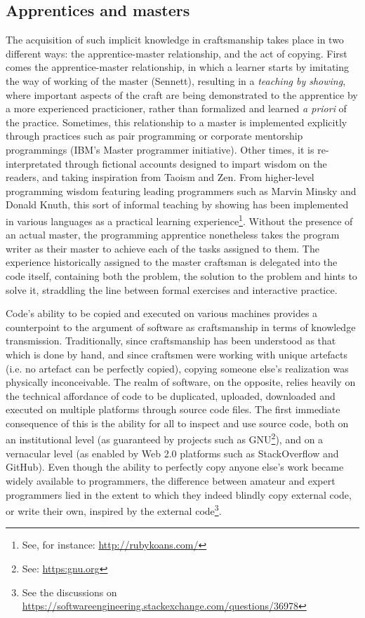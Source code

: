 \documentclass{article}
\begin{document}
\subsection{Apprentices and masters}

The acquisition of such implicit knowledge in craftsmanship takes place in two different ways: the apprentice-master relationship, and the act of copying. First comes the apprentice-master relationship, in which a learner starts by  imitating the way of working of the master (Sennett), resulting in a \emph{teaching by showing}, where important aspects of the craft are being demonstrated to the apprentice by a more experienced practicioner, rather than formalized and learned \emph{a priori} of the practice. Sometimes, this relationship to a master is implemented explicitly through practices such as pair programming\cite{williams_pair_2003} or corporate mentorship programmings (IBM's Master programmer initiative). Other times, it is re-interpretated through fictional accounts designed to impart wisdom on the readers, and taking inspiration from Taoism and Zen\cite{james_tao_1987,raymond_new_1996}. From higher-level programming wisdom featuring leading programmers such as Marvin Minsky and Donald Knuth, this sort of informal teaching by showing has been implemented in various languages as a practical learning experience\footnote{See, for instance: \url{http://rubykoans.com/}}. Without the presence of an actual master, the programming apprentice nonetheless takes the program writer as their master to achieve each of the tasks assigned to them. The experience historically assigned to the master craftsman is delegated into the code itself, containing both the problem, the solution to the problem and hints to solve it, straddling the line between formal exercises and interactive practice.

Code's ability to be copied and executed on various machines provides a counterpoint to the argument of software as craftsmanship in terms of knowledge transmission. Traditionally, since craftsmanship has been understood as that which is done by hand, and since craftsmen were working with unique artefacts (i.e. no artefact can be perfectly copied), copying someone else's realization was physically inconceivable. The realm of software, on the opposite, relies heavily on the technical affordance of code to be duplicated, uploaded, downloaded and executed on multiple platforms through source code files\cite{manovich_language_2001}. The first immediate consequence of this is the ability for all to inspect and use source code, both on an institutional level (as guaranteed by projects such as GNU\footnote{See: \url{https:gnu.org}}), and on a vernacular level (as enabled by Web 2.0 platforms such as StackOverflow and GitHub). Even though the ability to perfectly copy anyone else's work became widely available to programmers, the difference between amateur and expert programmers lied in the extent to which they indeed blindly copy external code, or write their own, inspired by the external code\footnote{See the discussions on \url{https://softwareengineering.stackexchange.com/questions/36978}}.
\end{document}
